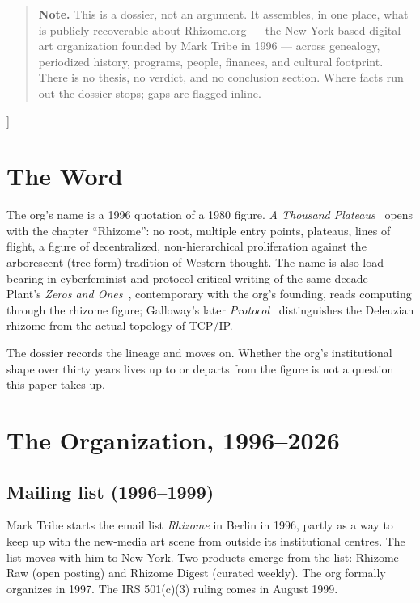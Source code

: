 \documentclass[10pt,letterpaper,twocolumn]{article}
\begin{document}
{\begin{quote}
\small\noindent\textbf{Note.} This is a dossier, not an argument. It assembles, in one place, what is publicly recoverable about Rhizome.org --- the New York-based digital art organization founded by Mark Tribe in 1996 --- across genealogy, periodized history, programs, people, finances, and cultural footprint. There is no thesis, no verdict, and no conclusion section. Where facts run out the dossier stops; gaps are flagged inline.
\end{quote}
\vspace{0.5em}
}]

\section{The Word}

The org's name is a 1996 quotation of a 1980 figure. \emph{A Thousand Plateaus}~\citep{deleuze1987thousand} opens with the chapter ``Rhizome'': no root, multiple entry points, plateaus, lines of flight, a figure of decentralized, non-hierarchical proliferation against the arborescent (tree-form) tradition of Western thought. The name is also load-bearing in cyberfeminist and protocol-critical writing of the same decade --- Plant's \emph{Zeros and Ones}~\citep{plant1997zeros}, contemporary with the org's founding, reads computing through the rhizome figure; Galloway's later \emph{Protocol}~\citep{galloway2004protocol} distinguishes the Deleuzian rhizome from the actual topology of TCP/IP.

The dossier records the lineage and moves on. Whether the org's institutional shape over thirty years lives up to or departs from the figure is not a question this paper takes up.

\section{The Organization, 1996--2026}

\subsection{Mailing list (1996--1999)}

Mark Tribe starts the email list \emph{Rhizome} in Berlin in 1996, partly as a way to keep up with the new-media art scene from outside its institutional centres. The list moves with him to New York. Two products emerge from the list: Rhizome Raw (open posting) and Rhizome Digest (curated weekly). The org formally organizes in 1997. The IRS 501(c)(3) ruling comes in August 1999.
\end{document}
